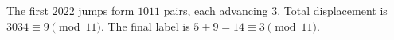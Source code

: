 The first $2022$ jumps form $1011$ pairs, each advancing $3$. Total displacement is $3034\equiv9\pmod{11}$. The final label is $5+9=14\equiv\boxed3\pmod{11}$.

